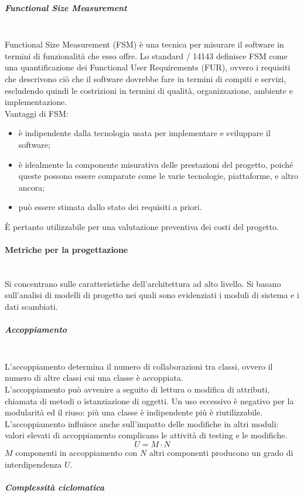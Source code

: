 \subparagraph{Functional Size Measurement}\mbox{}\\
Functional Size Measurement (FSM) è una tecnica per misurare il software in termini di funzionalità che esso offre. Lo standard / 14143 definisce FSM come una quantificazione dei Functional User Requirements (FUR), ovvero i requisiti che descrivono ciò che il software dovrebbe fare in termini di compiti e servizi, escludendo quindi le costrizioni in termini di qualità, organizzazione, ambiente e implementazione.\\
Vantaggi di FSM:
\begin{itemize}
	\item è indipendente dalla tecnologia usata per implementare e sviluppare il software;
	\item è idealmente la componente misurativa delle prestazioni del progetto, poiché queste possono essere comparate come le varie tecnologie, piattaforme, e altro ancora;
	\item può essere stimata dallo stato dei requisiti a priori.
\end{itemize}
\`{E} pertanto utilizzabile per una valutazione preventiva dei costi del progetto.

\paragraph{Metriche per la progettazione}\mbox{}\\
Si concentrano sulle caratteristiche dell'architettura ad alto livello. Si basano sull'analisi di modelli di progetto nei quali sono evidenziati i moduli di sistema e i dati scambiati.

\subparagraph{Accoppiamento}\mbox{}\\
L'accoppiamento determina il numero di collaborazioni tra classi, ovvero il numero di altre classi cui una classe è accoppiata.\\
L'accoppiamento può avvenire a seguito di lettura o modifica di attributi, chiamata di metodi o istanziazione di oggetti. Un uso eccessivo è negativo per la modularità ed il riuso: più una classe è indipendente più è riutilizzabile. L'accoppiamento influisce anche sull'impatto delle modifiche in altri moduli: valori elevati di accoppiamento complicano le attività di testing e le modifiche.
\[ U = M \cdot N \]
$M$ componenti in accoppiamento con $N$ altri componenti producono un grado di interdipendenza $U$.

\subparagraph{Complessità ciclomatica}\mbox{}\\

